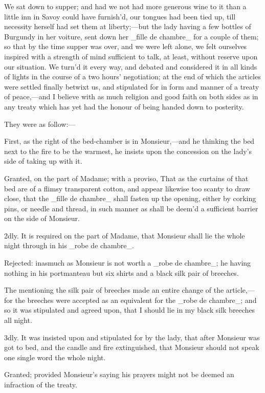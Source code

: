 \documentclass[twoside]{article}
\begin{document}
We sat down to supper; and had we not had more generous wine to it than a
little inn in Savoy could have furnish’d, our tongues had been tied up,
till necessity herself had set them at liberty;—but the lady having a few
bottles of Burgundy in her voiture, sent down her _fille de chambre_ for
a couple of them; so that by the time supper was over, and we were left
alone, we felt ourselves inspired with a strength of mind sufficient to
talk, at least, without reserve upon our situation.  We turn’d it every
way, and debated and considered it in all kinds of lights in the course
of a two hours’ negotiation; at the end of which the articles were
settled finally betwixt us, and stipulated for in form and manner of a
treaty of peace,—and I believe with as much religion and good faith on
both sides as in any treaty which has yet had the honour of being handed
down to posterity.

They were as follow:—

First, as the right of the bed-chamber is in Monsieur,—and he thinking
the bed next to the fire to be the warmest, he insists upon the
concession on the lady’s side of taking up with it.

Granted, on the part of Madame; with a proviso, That as the curtains of
that bed are of a flimsy transparent cotton, and appear likewise too
scanty to draw close, that the _fille de chambre_ shall fasten up the
opening, either by corking pins, or needle and thread, in such manner as
shall be deem’d a sufficient barrier on the side of Monsieur.

2dly.  It is required on the part of Madame, that Monsieur shall lie the
whole night through in his _robe de chambre_.

Rejected: inasmuch as Monsieur is not worth a _robe de chambre_; he
having nothing in his portmanteau but six shirts and a black silk pair of
breeches.

The mentioning the silk pair of breeches made an entire change of the
article,—for the breeches were accepted as an equivalent for the _robe de
chambre_; and so it was stipulated and agreed upon, that I should lie in
my black silk breeches all night.

3dly.  It was insisted upon and stipulated for by the lady, that after
Monsieur was got to bed, and the candle and fire extinguished, that
Monsieur should not speak one single word the whole night.

Granted; provided Monsieur’s saying his prayers might not be deemed an
infraction of the treaty.
\end{document}
